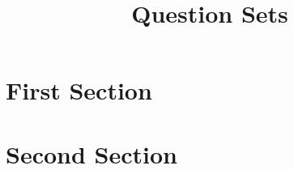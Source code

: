 \documentclass[titlepage, 12pt, a4paper]{article}
\title{Question Sets}
\author{}
\date{}
\begin{document}
    \maketitle

    \section{First Section}
    

    \newpage

    \section{Second Section}
    
\end{document}
